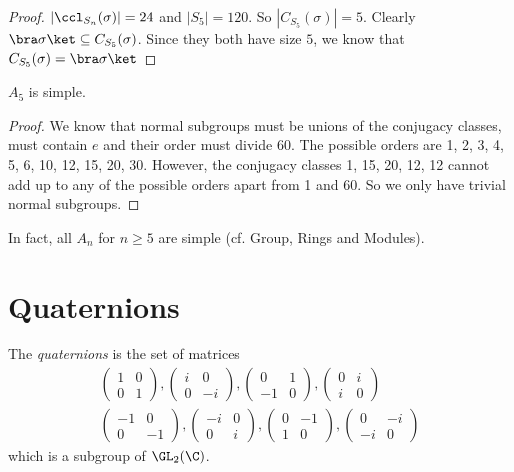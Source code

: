 \documentclass[a4paper]{article}
\begin{document}
\begin{proof}
  $|\ccl_{S_n}(\sigma)| = 24$ and $|S_5| = 120$. So $|C_{S_5}(\sigma)| = 5$. Clearly $\bra \sigma \ket \subseteq C_{S_5}(\sigma)$. Since they both have size $5$, we know that $C_{S_5}(\sigma) = \bra \sigma\ket$
\end{proof}

\begin{thm}
  $A_5$ is simple.
\end{thm}

\begin{proof}
  We know that normal subgroups must be unions of the conjugacy classes, must contain $e$ and their order must divide 60. The possible orders are 1, 2, 3, 4, 5, 6, 10, 12, 15, 20, 30. However, the conjugacy classes 1, 15, 20, 12, 12 cannot add up to any of the possible orders apart from 1 and 60. So we only have trivial normal subgroups.
\end{proof}
In fact, all $A_n$ for $n\geq 5$ are simple (cf. Group, Rings and Modules).

\section{Quaternions}
\begin{defi}[Quaternions]
  The \emph{quaternions} is the set of matrices
  \begin{gather*}
    \begin{pmatrix}
      1&0\\0&1
    \end{pmatrix},
    \begin{pmatrix}
      i & 0\\0&-i
    \end{pmatrix},
    \begin{pmatrix}
      0&1\\-1&0
    \end{pmatrix},
    \begin{pmatrix}
      0&i\\i&0
    \end{pmatrix}
    \\
    \begin{pmatrix}
      -1&0\\0&-1
    \end{pmatrix},
    \begin{pmatrix}
      -i & 0\\0&i
    \end{pmatrix},
    \begin{pmatrix}
      0&-1\\1&0
    \end{pmatrix},
    \begin{pmatrix}
      0&-i\\-i&0
    \end{pmatrix}
  \end{gather*}
  which is a subgroup of $\GL_2(\C)$.
\end{defi}
\end{document}
